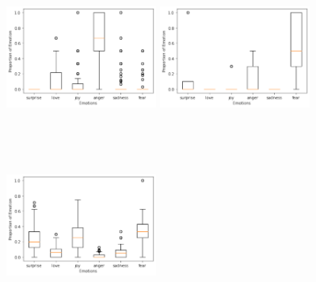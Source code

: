 \begin{figure}[h]
  \begin{minipage}{.33\textwidth}
    \centering
    \includegraphics[width=5cm,height=5.5cm,keepaspectratio]{plots/dis_anger.pdf}
  \end{minipage}%
  \begin{minipage}{.33\textwidth}
    \centering
    \includegraphics[width=5cm,height=5.5cm,keepaspectratio]{plots/dis_fear.pdf}
  \end{minipage}%
  \begin{minipage}{.33\textwidth}
    \centering
    \includegraphics[width=5cm,height=5.5cm,keepaspectratio]{plots/dis_joy.pdf}
  \end{minipage}
 \medskip
  \begin{minipage}{.5\textwidth}
    \centering

\end{minipage}
\end{figure}
